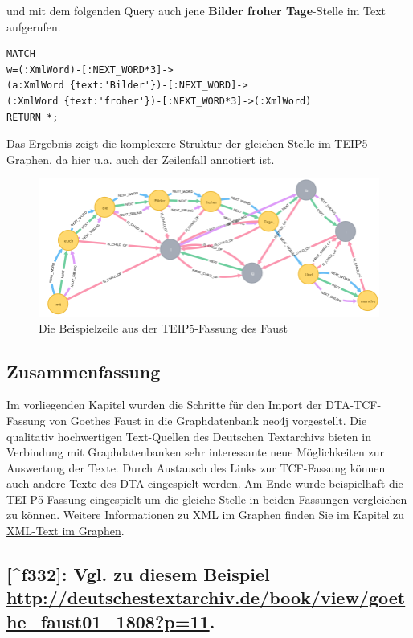 \documentclass[12pt,ngerman,]{article}
\begin{document}
und mit dem folgenden Query auch jene \textbf{Bilder froher Tage}-Stelle
im Text aufgerufen.

\begin{verbatim}
MATCH
w=(:XmlWord)-[:NEXT_WORD*3]->
(a:XmlWord {text:'Bilder'})-[:NEXT_WORD]->
(:XmlWord {text:'froher'})-[:NEXT_WORD*3]->(:XmlWord)
RETURN *;
\end{verbatim}

Das Ergebnis zeigt die komplexere Struktur der gleichen Stelle im
TEIP5-Graphen, da hier u.a. auch der Zeilenfall annotiert ist.

\begin{figure}
\centering
\includegraphics{Bilder/TEI2Graph/BilderFroherTageP5.png}
\caption{Die Beispielzeile aus der TEIP5-Fassung des Faust}
\end{figure}

\subsection{Zusammenfassung}\label{zusammenfassung-5}

Im vorliegenden Kapitel wurden die Schritte für den Import der
DTA-TCF-Fassung von Goethes Faust in die Graphdatenbank neo4j
vorgestellt. Die qualitativ hochwertigen Text-Quellen des Deutschen
Textarchivs bieten in Verbindung mit Graphdatenbanken sehr interessante
neue Möglichkeiten zur Auswertung der Texte. Durch Austausch des Links
zur TCF-Fassung können auch andere Texte des DTA eingespielt werden. Am
Ende wurde beispielhaft die TEI-P5-Fassung eingespielt um die gleiche
Stelle in beiden Fassungen vergleichen zu können. Weitere Informationen
zu XML im Graphen finden Sie im Kapitel zu
\href{https://kuczera.github.io/Graphentechnologien/60_XML-Text-im-Graphen.html}{XML-Text
im Graphen}.

\subsection{\texorpdfstring{{[}\^{}f332{]}: Vgl. zu diesem Beispiel
\url{http://deutschestextarchiv.de/book/view/goethe_faust01_1808?p=11}.}{{[}\^{}f332{]}: Vgl. zu diesem Beispiel http://deutschestextarchiv.de/book/view/goethe\_faust01\_1808?p=11.}}\label{f332-vgl.-zu-diesem-beispiel-httpdeutschestextarchiv.debookviewgoethe_faust01_1808p11.}
\end{document}
